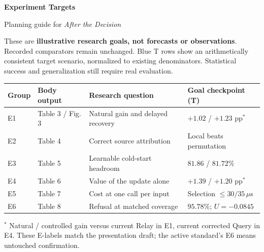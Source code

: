\documentclass[10pt,letterpaper]{article}
\newcommand{\note}[1]{{\fontsize{8.5}{10.5}\selectfont #1\par}}
\newenvironment{clean}{\begin{center}\fontsize{9.5}{11.5}\selectfont\setlength{\tabcolsep}{8pt}\renewcommand{\arraystretch}{1.10}}{\end{center}}
\begin{document}
{\LARGE\bfseries Experiment Targets}\par
{\large Planning guide for \emph{After the Decision}}\par
These are \textbf{illustrative research goals, not forecasts or observations}. Recorded comparators remain unchanged. Blue T rows show an arithmetically consistent target scenario, normalized to existing denominators. Statistical success and generalization still require real evaluation.

\begin{clean}
\begin{tabular}{@{}llp{2.13in}p{1.53in}@{}}
\toprule
Group & Body output & Research question & Goal checkpoint (T) \\
\midrule
E1 & Table 3 / Fig. 3 & Natural gain and delayed recovery & $+1.02$ / $+1.23$ pp$^*$ \\
E2 & Table 4 & Correct source attribution & Local beats permutation \\
E3 & Table 5 & Learnable cold-start headroom & $81.86$ / $81.72\%$ \\
E4 & Table 6 & Value of the update alone & $+1.39$ / $+1.20$ pp$^*$ \\
E5 & Table 7 & Cost at one call per input & Selection $\leq30/35\,\mu$s \\
E6 & Table 8 & Refusal at matched coverage & $95.78\%$; $U=-0.0845$ \\
\bottomrule
\end{tabular}
\end{clean}
\note{$^*$ Natural / controlled gain versus current Relay in E1, current corrected Query in E4. These E-labels match the presentation draft; the active standard's E6 means untouched confirmation.}
\end{document}
